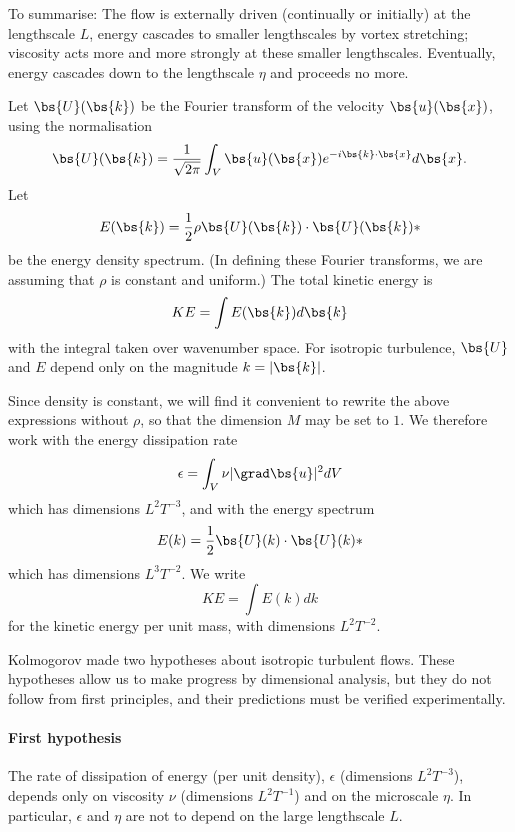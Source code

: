To summarise: The flow is externally driven (continually or initially) at the lengthscale $L$, energy cascades to smaller lengthscales by vortex stretching; viscosity acts more and more strongly at these smaller lengthscales. Eventually, energy cascades down to the lengthscale $\eta$ and proceeds no more.

Let $\bs{U}(\bs{k})$ be the Fourier transform of the velocity $\bs{u}(\bs{x})$, using the normalisation
\begin{equation}
    \bs{U}(\bs{k}) = \frac{1}{\sqrt{2\pi}} \int_V \bs{u}(\bs{x}) e^{-i\bs{k}\cdot\bs{x}} d\bs{x}.
\end{equation}
Let 
\begin{equation}
    E(\bs{k}) = \frac{1}{2}\rho\bs{U}(\bs{k})\cdot\bs{U}(\bs{k})*
\end{equation}
be the energy density spectrum. (In defining these Fourier transforms, we are assuming that $\rho$ is constant and uniform.) The total kinetic energy is
\begin{equation}
    KE = \int E(\bs{k}) d\bs{k}
\end{equation}
with the integral taken over wavenumber space. For isotropic turbulence, $\bs{U}$ and $E$ depend only on the magnitude $k=|\bs{k}|$. 

Since density is constant, we will find it convenient to rewrite the above expressions without $\rho$, so that the dimension $M$ may be set to $1$. We therefore work with the energy dissipation rate 
\begin{equation}
    \epsilon = \int_V\nu|\grad\bs{u}|^2dV
\end{equation}
which has dimensions $L^2 T^{-3}$, and with the energy spectrum
\begin{equation}
    E(k) = \frac{1}{2}\bs{U}(k)\cdot\bs{U}(k)*
\end{equation}
which has dimensions $L^3 T^{-2}$. We write 
\begin{equation}
    KE = \int E(k) dk
\end{equation}
for the kinetic energy per unit mass, with dimensions $L^2 T^{-2}$.

Kolmogorov made two hypotheses about isotropic turbulent flows. These hypotheses allow us to make progress by dimensional analysis, but they do not follow from first principles, and their predictions must be verified experimentally.

\paragraph{First hypothesis} The rate of dissipation of energy (per unit density), $\epsilon$ (dimensions $L^2T^{-3}$), depends only on viscosity $\nu$ (dimensions $L^2T^{-1}$) and on the microscale $\eta$. In particular, $\epsilon$ and $\eta$ are not to depend on the large lengthscale $L$.


